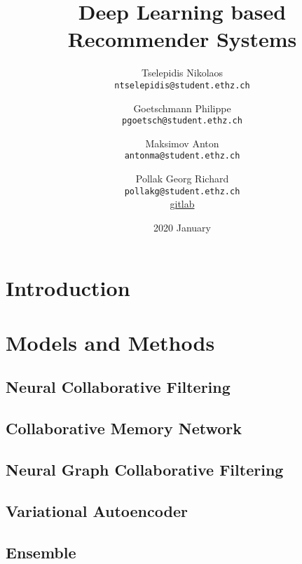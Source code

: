 \documentclass[
  twoColumns,
  fontsize=10pt,
  baseClass=extarticle
]{formularyETH/formularyETH}
\title{Deep Learning based Recommender Systems}
\author{
Tselepidis Nikolaos \\
\small{\texttt{ntselepidis@student.ethz.ch}}
    \and
Goetschmann Philippe \\
\small{\texttt{pgoetsch@student.ethz.ch}}
    \and
Maksimov Anton \\
\small{\texttt{antonma@student.ethz.ch}}
    \and
Pollak Georg Richard \\
\small{\texttt{pollakg@student.ethz.ch}}\\
{\normalsize
\faGithub\href{https://gitlab.ethz.ch/master/electives/deep-learning/deep-learning-based-recommender-systems/tree/master}{gitlab}
}
}
\date{2020 January}
\begin{document}
\twocolumn[{%
  \begin{@twocolumnfalse} 
  \centering
  \maketitle
  \begin{abstract}
    
  \end{abstract}
  \end{@twocolumnfalse}
  \vspace*{-3em}
}]

\section{Introduction}\label{sec:introduction}


\section{Models and Methods}\label{sec:models_and_methods}
\subsection{Neural Collaborative Filtering}\label{subsec:neural_collaborative_filtering}

\subsection{Collaborative Memory Network}\label{subsec:collaborative_memory_network}

\subsection{Neural Graph Collaborative Filtering}\label{subsec:neural_graph_collaborative_filtering}

\subsection{Variational Autoencoder}\label{subsec:variational_autoencoder}

\subsection{Ensemble}\label{subsec:ensemble}

\end{document}
